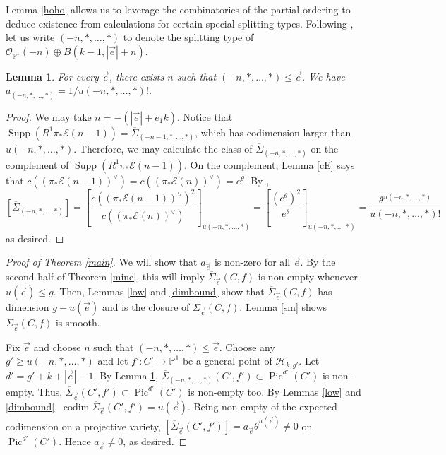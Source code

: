 \documentclass[12pt]{amsart}
\newcommand{\pp}{\mathbb{P}}
\newcommand{\E}{\mathcal{E}}
\renewcommand{\H}{\mathcal{H}}
\renewcommand{\O}{\mathscr{O}}
\DeclareMathOperator{\codim}{codim}
\newtheorem{Lemma}[theorem]{Lemma}
\DeclareMathOperator{\Pic}{Pic}
\DeclareMathOperator{\Supp}{Supp}
\newcommand{\Sigmabar}{\overline{\Sigma}}
\newcommand{\e}{\vec{e}}
\theoremstyle{definition}
\theoremstyle{remark}
\theoremstyle{remark}
\numberwithin{equation}{section}
\begin{document}
Lemma \ref{hoho} allows us to leverage the combinatorics of the partial ordering to deduce existence from calculations for certain special splitting types. Following \cite{L}, let us write $(-n, *, \ldots, *)$ to denote the splitting type of $\O_{\pp^1}(-n) \oplus B(k-1, |\vec{e}|+n)$.

\begin{Lemma} \label{comp}
For every $\e$, there exists $n$ such that $(-n, *, \ldots, *)\leq \e$.
We have $a_{(-n,*,\ldots, *)} = 1/u(-n,*,\ldots,*)!$.
\end{Lemma}
\begin{proof}
We may take $n = -(|\vec{e}| + e_1k)$.
Notice that $\Supp(R^1\pi_*\E(n-1)) = \Sigmabar_{(-n-1, *, \ldots, *)}$, which has codimension larger than $u(-n, *, \ldots, *)$. Therefore, we may calculate the class of $\Sigmabar_{(-n,*, \ldots, *)}$ on the complement of $\Supp(R^1\pi_*\E(n-1))$. On the complement, Lemma \ref{cE} says that $c((\pi_*\E(n-1))^\vee) = c((\pi_*\E(n))^\vee)  = e^{\theta}$.
By \cite[Lemma 5.1]{L},
\[[\Sigmabar_{(-n,*, \ldots, *)}] = \left[\frac{c((\pi_*\E(n-1))^\vee)^2}{c((\pi_* \E(n))^\vee)} \right]_{u(-n,*,\ldots, *)} = \left[\frac{(e^{\theta})^2}{e^\theta}\right]_{u(-n,*,\ldots, *)}=  \frac{\theta^{u(-n,*,\ldots,*)}}{u(-n,*,\ldots,*)!}\]
as desired.
\end{proof}

\begin{proof}[Proof of Theorem \ref{main}]
We will show that $a_{\vec{e}}$ is non-zero for all $\e$. By the second half of Theorem \ref{mine}, this will imply $\Sigmabar_{\vec{e}}(C, f)$ is non-empty whenever $u(\vec{e}) \leq g$. Then, Lemmas \ref{low} and \ref{dimbound} show that $\Sigmabar_{\vec{e}}(C, f)$ has dimension $g - u(\vec{e})$ and is the closure of $\Sigma_{\vec{e}}(C, f)$. Lemma \ref{sm} shows $\Sigma_{\vec{e}}(C, f)$ is smooth.

Fix $\vec{e}$ and choose $n$ such that $(-n, *, \ldots, *) \leq \e$. Choose any $g' \geq u(-n, *, \ldots, *)$ and let $f': C' \rightarrow \pp^1$ be a general point of $\H_{k,g'}$. Let $d' = g' + k + |\vec{e}| - 1$. By Lemma \ref{comp}, $\overline{\Sigma}_{(-n, *, \ldots, *)}(C',f') \subset \Pic^{d'}(C')$ is non-empty. Thus, $\overline{\Sigma}_{\e}(C', f') \subset \Pic^{d'}(C')$ is non-empty too. By Lemmas \ref{low} and \ref{dimbound}, $\codim \overline{\Sigma}_{\e}(C', f') = u(\e)$. Being non-empty of the expected codimension on a projective variety, $[\overline{\Sigma}_{\e}(C', f') ] = a_{\vec{e}} \theta^{u(\vec{e})} \neq 0$ on $\Pic^{d'}(C')$. Hence $a_{\vec{e}} \neq 0$, as desired.
\end{proof}
\end{document}
